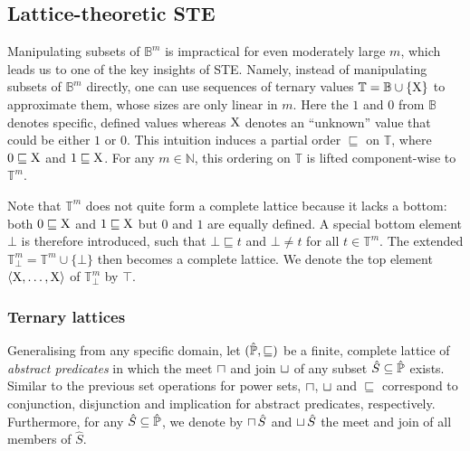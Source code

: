 \subsection{Lattice-theoretic STE} \label{sec:lat-ste}

Manipulating subsets of $\mathbb{B}^{m}$ is impractical for even moderately large $m$, which leads us to one of the key insights of STE. Namely, instead of manipulating subsets of $\mathbb{B}^{m}$ directly, one can use sequences of ternary values $\mathbb{T} = \mathbb{B} \cup \{ \mathrm{X} \} $ to approximate them, whose sizes are only linear in $m$. Here the $1$ and $0$ from $\mathbb{B}$ denotes specific, defined values whereas $\mathrm{X}$ denotes an ``unknown'' value that could be either $1$ or $0$. This intuition induces a partial order $\sqsubseteq$ on $\mathbb{T}$, where $0 \sqsubseteq \mathrm{X}$ and $1 \sqsubseteq \mathrm{X}$\footnotemark. For any $m \in \mathbb{N}$, this ordering on $\mathbb{T}$ is lifted component-wise to $\mathbb{T}^{m}$.



Note that $\mathbb{T}^{m}$ does not quite form a complete lattice because it lacks a bottom: both $0 \sqsubseteq \mathrm{X}$ and $1 \sqsubseteq \mathrm{X}$ but $0$ and $1$ are equally defined. A special bottom element $\bot$ is therefore introduced, such that $\bot \sqsubseteq t$ and $\bot \neq t$ for all $t \in \mathbb{T}^{m}$. The extended $\mathbb{T}_{\bot}^{m} = \mathbb{T}^{m} \cup \{ \bot \}$ then becomes a complete lattice. We denote the top element $\langle \mathrm{X}, \dots, \mathrm{X} \rangle$ of $\mathbb{T}_{\bot}^{m}$ by $\top$.

\subsubsection{Ternary lattices} \label{sec:lat-ste-intro}

Generalising from any specific domain, let $(\hat{\mathbb{P}}, \sqsubseteq)$ be a finite, complete lattice of \textit{abstract predicates} in which the meet $\operatorname{\sqcap}$ and join $\operatorname{\sqcup}$ of any subset $\hat S \subseteq \hat{\mathbb{P}}$ exists. Similar to the previous set operations for power sets, $\operatorname{\sqcap}$, $\operatorname{\sqcup}$ and $\sqsubseteq$ correspond to conjunction, disjunction and implication for abstract predicates, respectively. Furthermore, for any $\hat S \subseteq \hat{\mathbb{P}}$, we denote by $\operatorname{\sqcap} \hat S$ and $\operatorname{\sqcup} \hat S$ the meet and join of all members of $\hat S$.

